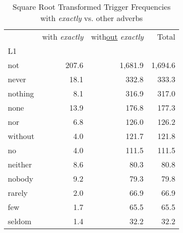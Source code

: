
\begin{table}[ht]
\caption{Square Root Transformed Trigger Frequencies\\with \textit{exactly} vs. other adverbs}
\label{trig-exactly-others}
\begin{tabular}{lrrr}
\toprule
 & with \textit{exactly} & with\underline{out} \textit{exactly} & Total \\
L1 &  &  &  \\
\midrule
not & {\cellcolor[HTML]{081D58}} \color[HTML]{F1F1F1} 207.6 & {\cellcolor[HTML]{081D58}} \color[HTML]{F1F1F1} 1,681.9 & {\cellcolor[HTML]{081D58}} \color[HTML]{F1F1F1} 1,694.6 \\
never & {\cellcolor[HTML]{F4FBC0}} \color[HTML]{000000} 18.1 & {\cellcolor[HTML]{DCF1B2}} \color[HTML]{000000} 332.8 & {\cellcolor[HTML]{DCF1B2}} \color[HTML]{000000} 333.3 \\
nothing & {\cellcolor[HTML]{FAFDCF}} \color[HTML]{000000} 8.1 & {\cellcolor[HTML]{DFF2B2}} \color[HTML]{000000} 316.9 & {\cellcolor[HTML]{E0F3B2}} \color[HTML]{000000} 317.0 \\
none & {\cellcolor[HTML]{F7FCC6}} \color[HTML]{000000} 13.9 & {\cellcolor[HTML]{F3FABD}} \color[HTML]{000000} 176.8 & {\cellcolor[HTML]{F3FABD}} \color[HTML]{000000} 177.3 \\
nor & {\cellcolor[HTML]{FCFED1}} \color[HTML]{000000} 6.8 & {\cellcolor[HTML]{F7FCC7}} \color[HTML]{000000} 126.0 & {\cellcolor[HTML]{F7FCC7}} \color[HTML]{000000} 126.2 \\
without & {\cellcolor[HTML]{FDFED5}} \color[HTML]{000000} 4.0 & {\cellcolor[HTML]{F8FCC9}} \color[HTML]{000000} 121.7 & {\cellcolor[HTML]{F8FCC9}} \color[HTML]{000000} 121.8 \\
no & {\cellcolor[HTML]{FDFED5}} \color[HTML]{000000} 4.0 & {\cellcolor[HTML]{F8FCCA}} \color[HTML]{000000} 111.5 & {\cellcolor[HTML]{F8FCCA}} \color[HTML]{000000} 111.5 \\
neither & {\cellcolor[HTML]{FAFDCF}} \color[HTML]{000000} 8.6 & {\cellcolor[HTML]{FBFDD0}} \color[HTML]{000000} 80.3 & {\cellcolor[HTML]{FBFDD0}} \color[HTML]{000000} 80.8 \\
nobody & {\cellcolor[HTML]{FAFDCE}} \color[HTML]{000000} 9.2 & {\cellcolor[HTML]{FBFDD0}} \color[HTML]{000000} 79.3 & {\cellcolor[HTML]{FBFDD0}} \color[HTML]{000000} 79.8 \\
rarely & {\cellcolor[HTML]{FFFFD9}} \color[HTML]{000000} 2.0 & {\cellcolor[HTML]{FCFED3}} \color[HTML]{000000} 66.9 & {\cellcolor[HTML]{FCFED3}} \color[HTML]{000000} 66.9 \\
few & {\cellcolor[HTML]{FFFFD9}} \color[HTML]{000000} 1.7 & {\cellcolor[HTML]{FCFED3}} \color[HTML]{000000} 65.5 & {\cellcolor[HTML]{FCFED3}} \color[HTML]{000000} 65.5 \\
seldom & {\cellcolor[HTML]{FFFFD9}} \color[HTML]{000000} 1.4 & {\cellcolor[HTML]{FFFFD9}} \color[HTML]{000000} 32.2 & {\cellcolor[HTML]{FFFFD9}} \color[HTML]{000000} 32.2 \\
\bottomrule
\end{tabular}
\end{table}

